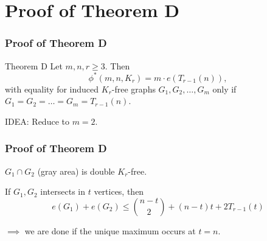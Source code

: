 \documentclass{beamer}
\begin{document}
\section{Proof of Theorem D}

\begin{frame}
  \frametitle{Proof of Theorem D}

  \begin{block}{Theorem D}
    Let $m, n, r \geq 3$. Then 
    \[
      \phi^*(m,n,K_{r}) = m \cdot e(T_{r - 1}(n)),
    \]
    with equality for induced $K_{r}$-free graphs $G_1, G_2, \dots, G_m$ only if $G_1 = G_2 = \dots = G_m = T_{r - 1}(n)$.  
  \end{block}

  \pause

  \vspace{0.7cm}

  IDEA: Reduce to $m = 2$.
\end{frame}

\begin{frame}
  \frametitle{Proof of Theorem D}

  \begin{center}
  \end{center}

  \pause

  $G_1 \cap G_2$ (gray area) is double $K_r$-free.

  \pause

  \vspace{0.5cm}

  If $G_1, G_2$ intersects in $t$ vertices, then
  \[
    e(G_1) + e(G_2) \leq \binom{n - t}{2} + (n - t)t + 2T_{r - 1}(t)
  \]

  \pause

  $\implies$ we are done if the unique maximum occurs at $t = n$.
\end{frame}
\end{document}
